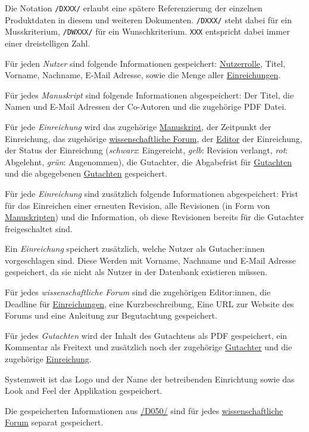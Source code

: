 
Die Notation \texttt{/DXXX/} erlaubt eine spätere Referenzierung der einzelnen Produktdaten in diesem und weiteren
Dokumenten. \texttt{/DXXX/} steht dabei für ein Musskriterium, \texttt{/DWXXX/} für ein Wunschkriterium. \texttt{XXX} entspricht dabei immer einer dreistelligen Zahl.

\begin{description}
	 Für jeden \emph{Nutzer} sind folgende Informationen gespeichert: \hyperref[funkt:nutzer]{Nutzerrolle}, Titel, Vorname, Nachname, E-Mail Adresse, sowie die Menge aller \hyperref[d025]{Einreichungen}.

	 Für jedes \emph{Manuskript} sind folgende Informationen abgespeichert: Der Titel, die Namen und E-Mail Adressen der Co-Autoren und die zugehörige PDF Datei.

	 Für jede \emph{Einreichung} wird das zugehörige \hyperref[d020]{Manuskript}, der Zeitpunkt der Einreichung, das zugehörige \hyperref[d030]{wissenschaftliche Forum}, der \hyperref[funkt:editor]{Editor} der Einreichung, der Status der Einreichung (\emph{schwarz}: Eingereicht, \emph{gelb}: Revision verlangt, \emph{rot}: Abgelehnt, \emph{grün}: Angenommen), die Gutachter, die Abgabefrist für \hyperref[d040]{Gutachten} und die abgegebenen \hyperref[d040]{Gutachten} gespeichert.

	 Für jede \emph{Einreichung} sind zusätzlich folgende Informationen abgespeichert: Frist für das Einreichen einer erneuten Revision, alle Revisionen (in Form von \hyperref[d020]{Manuskripten}) und die Information, ob diese Revisionen bereits für die Gutachter freigeschaltet sind.

	 Ein \emph{Einreichung} speichert zusätzlich, welche Nutzer als Gutacher:innen vorgeschlagen sind. Diese Werden mit Vorname, Nachname und E-Mail Adresse gespeichert, da sie nicht als Nutzer in der Datenbank existieren müssen.

	 Für jedes \emph{wissenschaftliche Forum} sind die zugehörigen Editor:innen, die Deadline für \hyperref[d025]{Einreichungen}, eine Kurzbeschreibung, Eine URL zur Website des Forums und eine Anleitung zur Begutachtung gespeichert.

	 Für jedes \emph{Gutachten} wird der Inhalt des Gutachtens als PDF gespeichert, ein Kommentar als Freitext und zusätzlich noch der zugehörige \hyperref[funkt:Gutachter]{Gutachter} und die zugehörige \hyperref[d025]{Einreichung}.

	 Systemweit ist das Logo und der Name der betreibenden Einrichtung sowie das Look and Feel der Applikation gespeichert.

	 Die gespeicherten Informationen aus \hyperref[d050]{/D050/} sind für jedes \hyperref[d030]{wissenschaftliche Forum} separat gespeichert.
\end{description}
